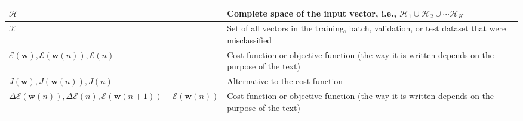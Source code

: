\begin{xltabular}{\textwidth}{XX}
	\(\mathscr{H}\)                                                                                                                                                                & Complete space of the input vector, i.e., \(\mathscr{H}_1 \cup \mathscr{H}_2 \cup \cdots \mathscr{H}_K \)                                                                                                                                                                                                                              \\ \hline
	\(\mathscr{X}\) \cite{haykinNeuralNetworksLearning2009}                                                                                                                        & Set of all vectors in the training, batch, validation, or test dataset that were misclassified                                                                                                                                                                                                                                          \\ \hline
	\(\mathscr{E}(\mathbf{w}), \mathscr{E}(\mathbf{w}(n)), \mathscr{E}(n)\)                                                                                                        & Cost function or objective function (the way it is written depends on the purpose of the text)                                                                                                                                                                                                                                         \\ \hline
	\(J(\mathbf{w}), J(\mathbf{w}(n)), J(n)\)                                                                                                                                      & Alternative to the cost function                                                                                                                                                                                                                                                                                                       \\ \hline
	\(\Delta\mathscr{E}(\mathbf{w}(n)), \Delta\mathscr{E}(n), \mathscr{E}(\mathbf{w}(n+1)) - \mathscr{E}(\mathbf{w}(n))\)                                                          & Cost function or objective function (the way it is written depends on the purpose of the text)                                                                                                                                                                                                                                         \\ \hline

\end{xltabular}
